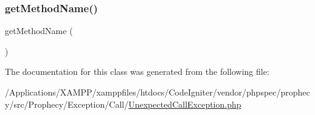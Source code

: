 \subsubsection{\texorpdfstring{get\+Method\+Name()}{getMethodName()}}
{\footnotesize\ttfamily get\+Method\+Name (\begin{DoxyParamCaption}{ }\end{DoxyParamCaption})}



The documentation for this class was generated from the following file\+:\begin{DoxyCompactItemize}
\item 
/\+Applications/\+X\+A\+M\+P\+P/xamppfiles/htdocs/\+Code\+Igniter/vendor/phpspec/prophecy/src/\+Prophecy/\+Exception/\+Call/\mbox{\hyperlink{_unexpected_call_exception_8php}{Unexpected\+Call\+Exception.\+php}}\end{DoxyCompactItemize}
